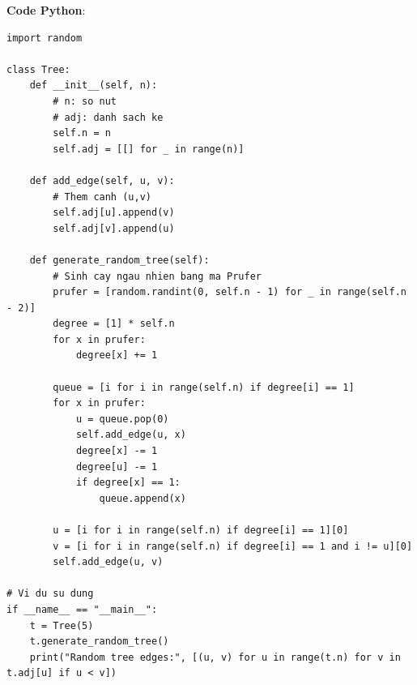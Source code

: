 \documentclass[a4paper,12pt]{article}
\begin{document}
\textbf{Code Python}:
\lstset{language=Python}
\begin{lstlisting}
import random

class Tree:
    def __init__(self, n):
        # n: so nut
        # adj: danh sach ke
        self.n = n
        self.adj = [[] for _ in range(n)]

    def add_edge(self, u, v):
        # Them canh (u,v)
        self.adj[u].append(v)
        self.adj[v].append(u)

    def generate_random_tree(self):
        # Sinh cay ngau nhien bang ma Prufer
        prufer = [random.randint(0, self.n - 1) for _ in range(self.n - 2)]
        degree = [1] * self.n
        for x in prufer:
            degree[x] += 1
        
        queue = [i for i in range(self.n) if degree[i] == 1]
        for x in prufer:
            u = queue.pop(0)
            self.add_edge(u, x)
            degree[x] -= 1
            degree[u] -= 1
            if degree[x] == 1:
                queue.append(x)
        
        u = [i for i in range(self.n) if degree[i] == 1][0]
        v = [i for i in range(self.n) if degree[i] == 1 and i != u][0]
        self.add_edge(u, v)

# Vi du su dung
if __name__ == "__main__":
    t = Tree(5)
    t.generate_random_tree()
    print("Random tree edges:", [(u, v) for u in range(t.n) for v in t.adj[u] if u < v])
\end{lstlisting}
\end{document}
